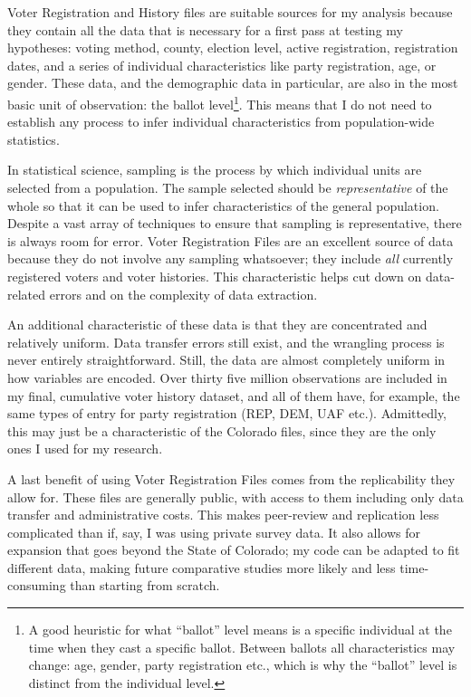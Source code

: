 \documentclass[]{article}
\let\rmarkdownfootnote\footnote%
\def\footnote{\protect\rmarkdownfootnote}
\begin{document}
Voter Registration and History files are suitable sources for my
analysis because they contain all the data that is necessary for a first
pass at testing my hypotheses: voting method, county, election level,
active registration, registration dates, and a series of individual
characteristics like party registration, age, or gender. These data, and
the demographic data in particular, are also in the most basic unit of
observation: the ballot level\footnote{A good heuristic for what
  ``ballot'' level means is a specific individual at the time when they
  cast a specific ballot. Between ballots all characteristics may
  change: age, gender, party registration etc., which is why the
  ``ballot'' level is distinct from the individual level.}. This means
that I do not need to establish any process to infer individual
characteristics from population-wide statistics.

In statistical science, sampling is the process by which individual
units are selected from a population. The sample selected should be
\emph{representative} of the whole so that it can be used to infer
characteristics of the general population. Despite a vast array of
techniques to ensure that sampling is representative, there is always
room for error. Voter Registration Files are an excellent source of data
because they do not involve any sampling whatsoever; they include
\emph{all} currently registered voters and voter histories. This
characteristic helps cut down on data-related errors and on the
complexity of data extraction.

An additional characteristic of these data is that they are concentrated
and relatively uniform. Data transfer errors still exist, and the
wrangling process is never entirely straightforward. Still, the data are
almost completely uniform in how variables are encoded. Over thirty five
million observations are included in my final, cumulative voter history
dataset, and all of them have, for example, the same types of entry for
party registration (REP, DEM, UAF etc.). Admittedly, this may just be a
characteristic of the Colorado files, since they are the only ones I
used for my research.

A last benefit of using Voter Registration Files comes from the
replicability they allow for. These files are generally public, with
access to them including only data transfer and administrative costs.
This makes peer-review and replication less complicated than if, say, I
was using private survey data. It also allows for expansion that goes
beyond the State of Colorado; my code can be adapted to fit different
data, making future comparative studies more likely and less
time-consuming than starting from scratch.
\end{document}
